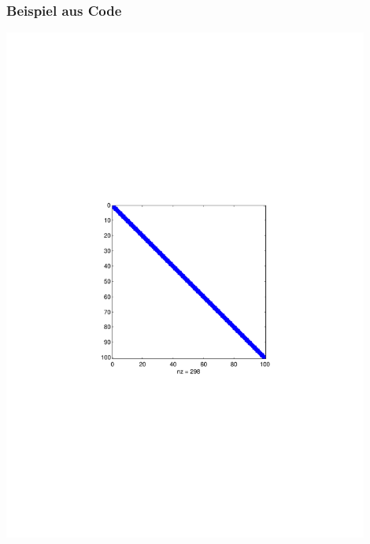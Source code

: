 \frame
{
\frametitle{Beispiel aus Code}
\begin{minipage}{0.48\textwidth}
\includegraphics[width=0.9\textwidth]{./Bilder/spy}
\end{minipage}
\hspace{0.1cm}
\begin{minipage}{0.48\textwidth}

\end{minipage}

}




